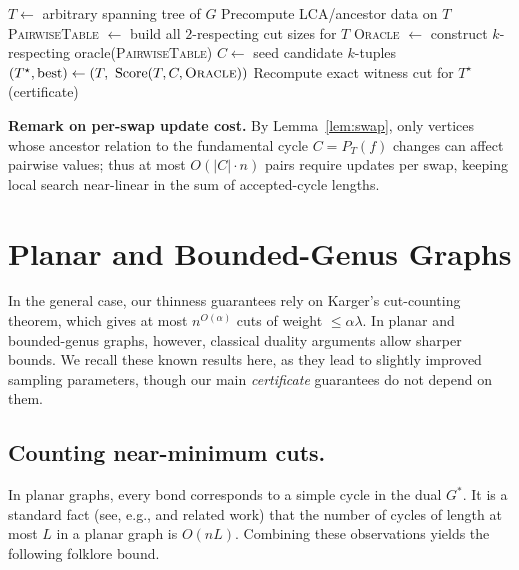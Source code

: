 \documentclass[11pt,letterpaper]{article}
\begin{document}
\begin{algorithm}[h]
\caption{Thin-Search$(G,k,B)$}
\label{alg:thinsearch}
$T \gets$ arbitrary spanning tree of $G$\;
Precompute LCA/ancestor data on $T$\;
\textsc{PairwiseTable} $\gets$ build all $2$-respecting cut sizes for $T$\;
\textsc{Oracle} $\gets$ construct $k$-respecting oracle(\textsc{PairwiseTable})\;
$C \gets$ seed candidate $k$-tuples\;
$(T^\star,\mathrm{best}) \gets (T,\ \mathrm{Score}(T,C,\textsc{Oracle}))$\;
Recompute exact witness cut for $T^\star$ (certificate)\;
\;
\end{algorithm}

\medskip
\noindent\textbf{Remark on per-swap update cost.}
By Lemma~\ref{lem:swap}, only vertices whose ancestor relation to the fundamental cycle $C=P_T(f)$ changes can affect pairwise values; thus at most $O(|C|\cdot n)$ pairs require updates per swap, keeping local search near-linear in the sum of accepted-cycle lengths.

\section{Planar and Bounded-Genus Graphs \label{sec:special}}
In the general case, our thinness guarantees rely on Karger’s cut-counting
theorem, which gives at most $n^{O(\alpha)}$ cuts of weight $\le \alpha\lambda$.
In planar and bounded-genus graphs, however, classical duality arguments
allow sharper bounds. We recall these known results here, as they lead to
slightly improved sampling parameters, though our main \emph{certificate}
guarantees do not depend on them.

\subsection{Counting near-minimum cuts.}
In planar graphs, every bond corresponds to a simple cycle in the dual $G^\ast$.
It is a standard fact (see, e.g., \cite{Kow03} and related work)
that the number of cycles of length at most $L$ in a planar graph is $O(nL)$.
Combining these observations yields the following folklore bound.
\end{document}
